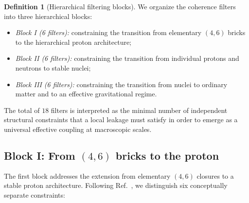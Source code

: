 \documentclass[11pt,a4paper]{article}
\theoremstyle{definition}
\newtheorem{definition}[theorem]{Definition}
\begin{document}
\begin{definition}[Hierarchical filtering blocks]
\label{def:filter_blocks}
We organize the coherence filters into three hierarchical blocks:
\begin{itemize}
  \item \emph{Block I (6 filters):} constraining the transition from elementary $(4,6)$ bricks to the hierarchical proton architecture;
  \item \emph{Block II (6 filters):} constraining the transition from individual protons and neutrons to stable nuclei;
  \item \emph{Block III (6 filters):} constraining the transition from nuclei to ordinary matter and to an effective gravitational regime.\cite{Exponent_18_PDL_2026}
\end{itemize}
The total of $18$ filters is interpreted as the minimal number of independent structural constraints that a local leakage must satisfy in order to emerge as a universal effective coupling at macroscopic scales.
\end{definition}

\subsection{Block I: From \texorpdfstring{$(4,6)$}{(4,6)} bricks to the proton}

The first block addresses the extension from elementary $(4,6)$ closures to a stable proton architecture. Following Ref.~\cite{Exponent_18_PDL_2026}, we distinguish six conceptually separate constraints:
\end{document}
